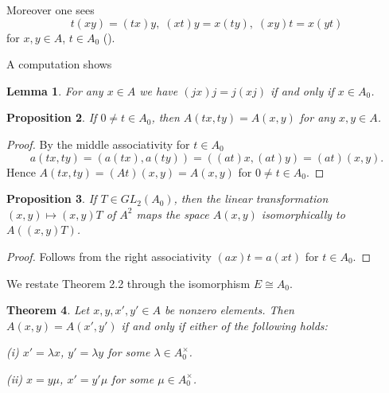 \documentclass[10pt,a4paper]{amsart}
\newtheorem{thm}{Theorem}[section]
\newtheorem{prop}[thm]{Proposition}
\newtheorem{lem}[thm]{Lemma}
\begin{document}
Moreover one sees 
$$
t(xy)=(tx)y,\; (xt)y=x(ty),\; (xy)t=x(yt)
$$
for $x,y\in A$, $t\in A_0$ (\cite{Knu}).


A computation shows

\begin{lem}
For any $x\in A$ we have $(jx)j=j(xj)$ if and only if $x\in A_0$.
\end{lem}



\begin{prop}
If $0\ne t\in A_0$, then $A(tx,ty)=A(x,y)$ for any $x,y\in A$.

\end{prop}

\begin{proof}
By the middle associativity for $t\in A_0$
$$
a(tx,ty)=(a(tx),a(ty))=((at)x,(at)y)=(at)(x,y).
$$
Hence
$A(tx,ty)=(At)(x,y)=A(x,y)$
for $0\ne t\in A_0$.
\end{proof}


\begin{prop}
If $T\in GL_2(A_0)$, then
the linear transformation $(x,y)\mapsto (x,y)T$ of $A^2$ maps the space
$A(x,y)$ isomorphically to $A((x,y)T)$.
\end{prop}

\begin{proof}
Follows  from the right associativity $(ax)t=a(xt)$ for $t\in A_0$.
\end{proof}

We restate Theorem 2.2 through the isomorphism $E\cong A_0$.


\begin{thm}
Let $x,y,x',y'\in A$ be nonzero elements.
Then $A(x,y)=A(x',y')$ if and only if either of the following holds:

(i) $x'=\lambda x$, $y'=\lambda y$ for some $\lambda\in A_0^{\times}$.

(ii) $x=y\mu$, $x'=y'\mu$
 for some $\mu\in A_0^{\times}$.
 
\end{thm}
\end{document}
